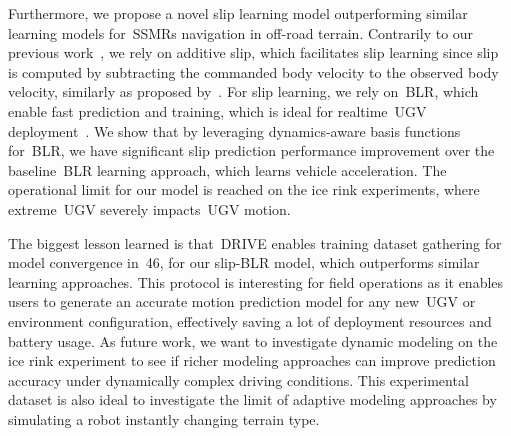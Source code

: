 Furthermore, we propose a novel slip learning model outperforming similar learning models for~\acp{SSMR} navigation in off-road terrain.
Contrarily to our previous work~\citep{Baril2020}, we rely on additive slip, which facilitates slip learning since slip is computed by subtracting the commanded body velocity to the observed body velocity, similarly as proposed by~\citet{Seegmiller2014}.
For slip learning, we rely on~\ac{BLR}, which enable fast prediction and training, which is ideal for realtime~\ac{UGV} deployment~\citep{Mckinnon2019}.
We show that by leveraging dynamics-aware basis functions for~\ac{BLR}, we have significant slip prediction performance improvement over the baseline~\ac{BLR} learning approach, which learns vehicle acceleration.
The operational limit for our model is reached on the ice rink experiments, where extreme~\ac{UGV} severely impacts~\ac{UGV} motion.

The biggest lesson learned is that~\ac{DRIVE} enables training dataset gathering for model convergence in~\SI{46}{\sec}, for our slip-\ac{BLR} model, which outperforms similar learning approaches.
This protocol is interesting for field operations as it enables users to generate an accurate motion prediction model for any new~\ac{UGV} or environment configuration, effectively saving a lot of deployment resources and battery usage.
As future work, we want to investigate dynamic modeling on the ice rink experiment to see if richer modeling approaches can improve prediction accuracy under dynamically complex driving conditions.
This experimental dataset is also ideal to investigate the limit of adaptive modeling approaches by simulating a robot instantly changing terrain type.

\begin{center}
	\textbf{}
\end{center}

